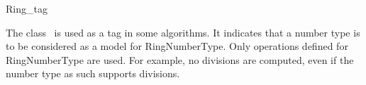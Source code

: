 \begin{ccRefClass} {Ring_tag}

\ccDefinition

The class \ccRefName\ is used as a tag in some algorithms. It
indicates that a number type is to be considered as a model for
RingNumberType. Only operations defined for RingNumberType are used.
For example, no divisions are computed, even if the number type as
such supports divisions.


\ccSeeAlso
{} \\
 \\
 \\

\end{ccRefClass} 
